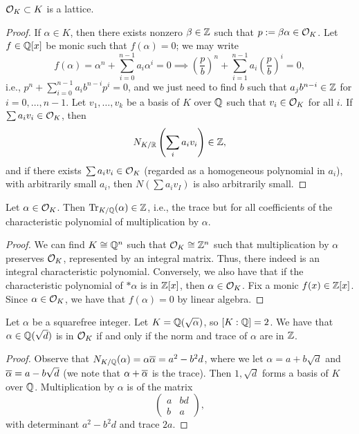 \newpage
\begin{corollary}
    $\mathcal O_K \subset K$ is a lattice.
\end{corollary}
\begin{proof}
    If $\alpha \in K$, then there exists nonzero $\beta \in \mathbb Z$ such that $p := \beta \alpha \in \mathcal O_K$. Let $f \in \mathbb Q[x]$ be monic such that $f(\alpha) = 0$; we may write
    \[ f(\alpha) = \alpha^n + \sum_{i=0}^{n-1} a_i \alpha^i = 0 \implies \left(\frac{p}{b}\right)^n + \sum_{i=1}^{n-1} a_i \left(\frac{p}{b}\right)^i = 0, \]
    i.e., $p^n + \sum_{i=0}^{n-1} a_i b^{n-i} p^i = 0$, and we just need to find $b$ such that $a_j b^{n-i} \in \mathbb Z$ for $i = 0, \dots, n-1$. Let $v_1, \dots, v_k$ be a basis of $K$ over $\mathbb Q$ such that $v_i \in \mathcal O_K$ for all $i$. If $\sum a_iv_i \in \mathcal O_K$, then
    \[ N_{K/\mathbb R}\left(\sum_i a_i v_i\right) \in \mathbb Z, \]
    and if there exists $\sum a_i v_i \in \mathcal O_K$ (regarded as a homogeneous polynomial in $a_i$), with arbitrarily small $a_i$, then $N(\sum a_iv_I)$ is also arbitrarily small.
\end{proof}
\begin{corollary}
    Let $\alpha \in \mathcal O_K$. Then $\operatorname{Tr}_{K/\mathbb Q}(\alpha) \in \mathbb Z$, i.e., the trace but for all coefficients of the characteristic polynomial of multiplication by $\alpha$.
\end{corollary}
\begin{proof}
    We can find $K \cong \mathbb Q^n$ such that $\mathcal O_K \cong \mathbb Z^n$ such that multiplication by $\alpha$ preserves $\mathcal O_K$, represented by an integral matrix. Thus, there indeed is an integral characteristic polynomial. Conversely, we also have that if the characteristic polynomial of $\ast \alpha$ is in $\mathbb Z[x]$, then $\alpha \in \mathcal O_K$. Fix a monic $f(x) \in \mathbb Z[x]$. Since $\alpha \in \mathcal O_K$, we have that $f(\alpha) = 0$ by linear algebra.
\end{proof}
\begin{corollary}
    Let $\alpha$ be a squarefree integer. Let $K = \mathbb Q(\sqrt{\alpha})$, so $[K:\mathbb Q] = 2$. We have that $\alpha \in \mathbb Q(\sqrt{d})$ is in $\mathcal O_K$ if and only if the norm and trace of $\alpha$ are in $\mathbb Z$.
\end{corollary}
\begin{proof}
    Observe that $N_{K/\mathbb Q}(\alpha) = \alpha \overline \alpha = a^2 - b^2 d$, where we let $\alpha = a + b \sqrt d$ and $\overline \alpha = a - b \sqrt d$ (we note that $\alpha + \overline \alpha$ is the trace). Then $1, \sqrt{d}$ forms a basis of $K$ over $\mathbb Q$. Multiplication by $\alpha$ is of the matrix
    \[ \begin{pmatrix} a & bd \\ b & a \end{pmatrix}, \]
    with determinant $a^2 - b^2 d$ and trace $2a$.
\end{proof}
